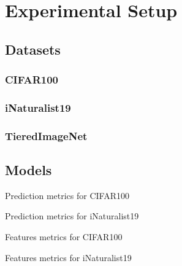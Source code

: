 \chapter{Experimental Setup}
\label{ch:experimental-setup}

\section{Datasets}
\label{sec:datasests}

\subsection{CIFAR100}
\label{subsec:cifar100}

\subsection{iNaturalist19}
\label{subsec:inaturalist19}

\subsection{TieredImageNet}
\label{subsec:tieredimagenet}


\section{Models}
\label{sec:models}

%
\begin{table}
  \renewcommand{\arraystretch}{1.2}%
  \centering
  \footnotesize
  
  \normalsize
  \caption{Prediction metrics for CIFAR100}
  \label{tab:CIFAR100-predictions-metrics}
\end{table}

\begin{table}
  \renewcommand{\arraystretch}{1.2}%
  \centering
  \footnotesize
  
  \normalsize
  \caption{Prediction metrics for iNaturalist19}
  \label{tab:iNaturalist19-predictions-metrics}
\end{table}


\begin{table}
  \renewcommand{\arraystretch}{1.2}%
  \centering
  \footnotesize
  
  \normalsize
  \caption{Features metrics for CIFAR100}
  \label{tab:CIFAR100-features-metrics}
\end{table}


\begin{table}
  \renewcommand{\arraystretch}{1.2}%
  \centering
  \footnotesize
  
  \normalsize
  \caption{Features metrics for iNaturalist19}
  \label{tab:iNaturalist19-features-metrics}
\end{table}
